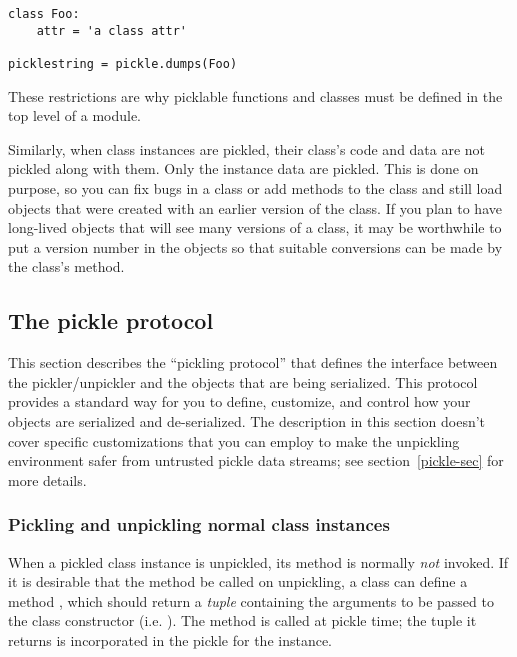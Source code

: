 \begin{verbatim}
class Foo:
    attr = 'a class attr'

picklestring = pickle.dumps(Foo)
\end{verbatim}

These restrictions are why picklable functions and classes must be
defined in the top level of a module.

Similarly, when class instances are pickled, their class's code and
data are not pickled along with them.  Only the instance data are
pickled.  This is done on purpose, so you can fix bugs in a class or
add methods to the class and still load objects that were created with
an earlier version of the class.  If you plan to have long-lived
objects that will see many versions of a class, it may be worthwhile
to put a version number in the objects so that suitable conversions
can be made by the class's  method.

\subsection{The pickle protocol
\label{pickle-protocol}}

This section describes the ``pickling protocol'' that defines the
interface between the pickler/unpickler and the objects that are being
serialized.  This protocol provides a standard way for you to define,
customize, and control how your objects are serialized and
de-serialized.  The description in this section doesn't cover specific
customizations that you can employ to make the unpickling environment
safer from untrusted pickle data streams; see section~\ref{pickle-sec}
for more details.

\subsubsection{Pickling and unpickling normal class
    instances\label{pickle-inst}}

When a pickled class instance is unpickled, its 
method is normally \emph{not} invoked.  If it is desirable that the
 method be called on unpickling, a class can define
a method , which should return a
\emph{tuple} containing the arguments to be passed to the class
constructor (i.e. ).  The
 method is called at
pickle time; the tuple it returns is incorporated in the pickle for
the instance.

